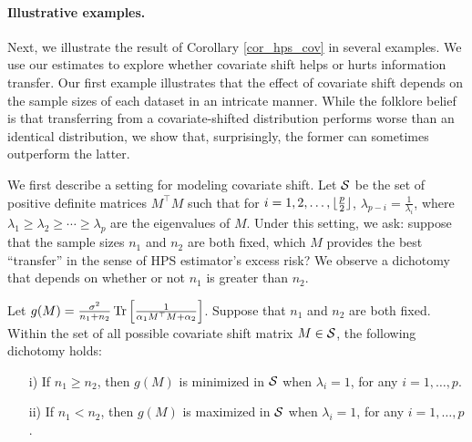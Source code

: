 \paragraph{Illustrative examples.} Next, we illustrate the result of Corollary \ref{cor_hps_cov} in several examples.
We use our estimates to explore whether covariate shift helps or hurts information transfer.
Our first example illustrates that the effect of covariate shift depends on the sample sizes of each dataset in an intricate manner.
    While the folklore belief is that transferring from a covariate-shifted distribution performs worse than an identical distribution, we show that, surprisingly, the former can sometimes outperform the latter.
    
    We first describe a setting for modeling covariate shift.
    Let $\mathcal{S}$ be the set of positive definite matrices $M^{\top} M$ such that for $i = 1,2,\dots,\lfloor {\frac p 2} \rfloor$, $\lambda_{p - i}  = \frac 1 {\lambda_i}$, where $\lambda_1 \ge \lambda_2 \ge \cdots \ge \lambda_p$ are the eigenvalues of $M$.
    Under this setting, we ask: suppose that the sample sizes $n_1$ and $n_2$ are both fixed, which $M$ provides the best ``transfer'' in the sense of HPS estimator's excess risk?
    We observe a dichotomy that depends on whether or not $n_1$ is greater than $n_2$.
    \begin{claim}\label{claim_dichotomy}
        Let $g(M) = \frac{\sigma^2}{n_1 + n_2} \operatorname{Tr}\left[\frac 1 {\alpha_1 M^{\top} M + \alpha_2}\right]$.
        Suppose that $n_1$ and $n_2$ are both fixed.
        Within the set of all possible covariate shift matrix $M\in\mathcal{S}$, the following dichotomy holds:
        \begin{enumerate}
	        \item[i)] If $n_1 \ge n_2$, then $g(M)$ is minimized in $\mathcal{S}$ when $\lambda_i = 1$, for any $i = 1,\dots,p$.
	        \item[ii)] If $n_1 < n_2$, then $g(M)$ is maximized in $\mathcal{S}$ when $\lambda_i = 1$, for any $i = 1,\dots,p$.
        \end{enumerate}
    \end{claim}

